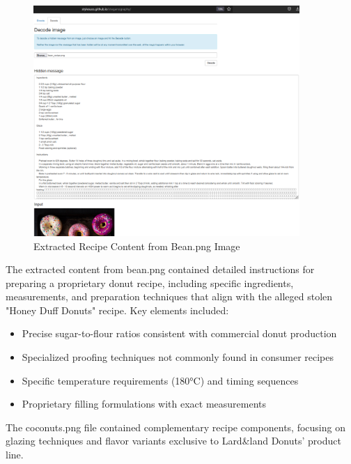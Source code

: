 \begin{figure}[h]
    \centering
    \includegraphics[width=0.9\textwidth]{images/Artifact and Evidence Recovery/bean_extract.png}
    \caption{Extracted Recipe Content from Bean.png Image}
    \label{fig:extracted_recipe}
\end{figure}

The extracted content from bean.png contained detailed instructions for preparing a proprietary donut recipe, including specific ingredients, measurements, and preparation techniques that align with the alleged stolen "Honey Duff Donuts" recipe. Key elements included:

\begin{itemize}
    \item Precise sugar-to-flour ratios consistent with commercial donut production
    \item Specialized proofing techniques not commonly found in consumer recipes
    \item Specific temperature requirements (180°C) and timing sequences
    \item Proprietary filling formulations with exact measurements
\end{itemize}

The coconuts.png file contained complementary recipe components, focusing on glazing techniques and flavor variants exclusive to Lard\&land Donuts' product line.


